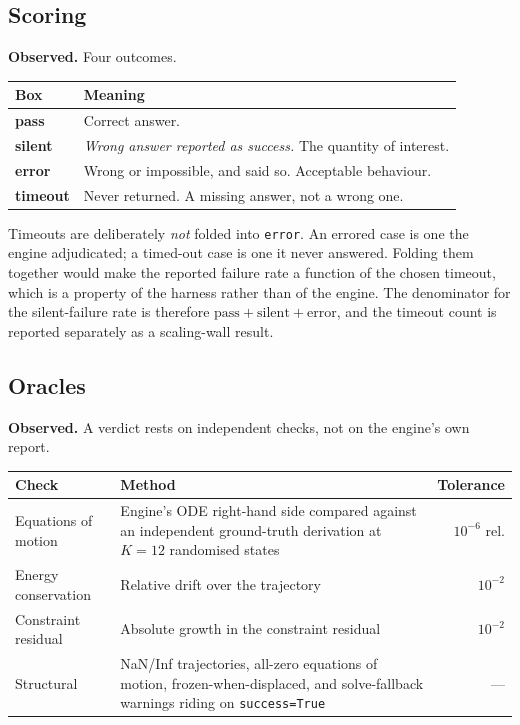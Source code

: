 \documentclass[11pt,a4paper]{article}
\begin{document}
\subsection{Scoring}

\noindent\textbf{Observed.} Four outcomes.

\begin{center}
\begin{tabular}{@{}lL{0.62\textwidth}@{}}
\toprule
\textbf{Box} & \textbf{Meaning} \\
\midrule
\textbf{pass}    & Correct answer. \\
\textbf{silent}  & \emph{Wrong answer reported as success.} The quantity of interest. \\
\textbf{error}   & Wrong or impossible, and said so. Acceptable behaviour. \\
\textbf{timeout} & Never returned. A missing answer, not a wrong one. \\
\bottomrule
\end{tabular}
\end{center}

\noindent Timeouts are deliberately \emph{not} folded into \texttt{error}. An
errored case is one the engine adjudicated; a timed-out case is one it never
answered. Folding them together would make the reported failure rate a function
of the chosen timeout, which is a property of the harness rather than of the
engine. The denominator for the silent-failure rate is therefore
$\mathrm{pass} + \mathrm{silent} + \mathrm{error}$, and the timeout count is
reported separately as a scaling-wall result.

\subsection{Oracles}

\noindent\textbf{Observed.} A verdict rests on independent checks, not on the
engine's own report.

\begin{center}
\begin{tabular}{@{}lL{0.42\textwidth}r@{}}
\toprule
\textbf{Check} & \textbf{Method} & \textbf{Tolerance} \\
\midrule
Equations of motion & Engine's ODE right-hand side compared against an
independent ground-truth derivation at $K=12$ randomised states & $10^{-6}$ rel. \\
Energy conservation & Relative drift over the trajectory & $10^{-2}$ \\
Constraint residual & Absolute growth in the constraint residual & $10^{-2}$ \\
Structural          & NaN/Inf trajectories, all-zero equations of motion,
frozen-when-displaced, and solve-fallback warnings riding on
\texttt{success=True} & --- \\
\bottomrule
\end{tabular}
\end{center}
\end{document}
